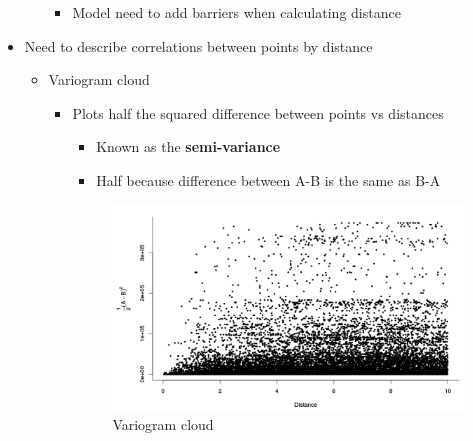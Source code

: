 \documentclass{article}
\begin{document}
\begin{itemize}
\begin{enumerate}
\begin{itemize}
            \item Model need to add barriers when calculating distance
        \end{itemize}
    \end{enumerate}
    \item Need to describe correlations between points by distance
    \begin{itemize}
        \item Variogram cloud
        \begin{itemize}
            \item Plots half the squared difference between points vs distances
            \begin{itemize}
                \item Known as the \textbf{semi-variance}
                \item Half because difference between A-B is the same as B-A
            \end{itemize}

            \begin{figure}[h]
                \centering
                \caption{Variogram cloud}
                \label{variogram cloud}
                \includegraphics[width=14cm]{variogram-cloud.png}
            \end{figure}


\end{itemize}
\end{itemize}
\end{itemize}
\end{document}
